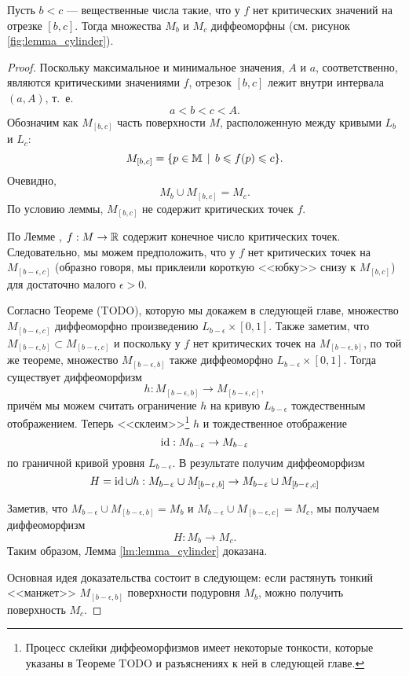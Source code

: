 \documentclass[a4paper,12pt,openany,leqno]{extbook}
\begin{document}
\begin{lemma}
Пусть $b < c$ --- вещественные числа такие, что у $f$ нет критических значений на отрезке $[b, c]$. Тогда множества $M_b$ и $M_c$ диффеоморфны (см. рисунок \ref{fig:lemma_cylinder}).
\label{lm:lemma_cylinder}
\end{lemma}

\begin{proof}
Поскольку максимальное и минимальное значения, $A$ и $a$, соответственно, являются критическими значениями $f$, отрезок $[b, c]$ лежит внутри интервала $(a, A)$, т.~е.
\[
a < b < c < A.
\]
Обозначим как $M_{[b, c]}$ часть поверхности $M$, расположенную между кривыми $L_b$ и $L_c$:
\begin{equation}
M_{[b, c]} = \{p \in \mathbb{M}\,\mid\, b \leqslant f(p) \leqslant c\}.
\end{equation}
Очевидно,
\begin{equation}
M_b \cup M_{[b, c]} = M_c.
\end{equation}
По условию леммы, $M_{[b, c]}$ не содержит критических точек $f$.

По Лемме \label{lm:finite_crit_pts_2d}, $f: M \to \mathbb{R}$ содержит конечное число критических точек. Следовательно, мы можем предположить, что у $f$ нет критических точек на $M_{[b - \epsilon, c]}$ (образно говоря, мы приклеили короткую <<юбку>> снизу к $M_{[b, c]}$) для достаточно малого $\epsilon > 0$.

Согласно Теореме (TODO), которую мы докажем в следующей главе, множество $M_{[b - \epsilon, c]}$ диффеоморфно произведению $L_{b - \epsilon} \times [0, 1]$. Также заметим, что $M_{[b - \epsilon, b]} \subset M_{[b - \epsilon, c]}$ и поскольку у $f$ нет критических точек на $M_{[b - \epsilon, b]}$, по той же теореме, множество $M_{[b - \epsilon, b]}$ также диффеоморфно $L_{b - \epsilon} \times [0, 1]$. Тогда существует диффеоморфизм
\[
h: M_{[b - \epsilon, b]} \to M_{[b - \epsilon, c]},
\]
причём мы можем считать ограничение $h$ на кривую $L_{b - \epsilon}$ тождественным отображением. Теперь <<склеим>>\footnote{Процесс склейки диффеоморфизмов имеет некоторые тонкости, которые указаны в Теореме TODO и разъяснениях к ней в следующей главе.} $h$ и тождественное отображение
\[
\operatorname{id} : M_{b - \upvarepsilon} \to M_{b - \upvarepsilon}
\]
по граничной кривой уровня $L_{b - \epsilon}$. В результате получим диффеоморфизм
\begin{equation}
H = \operatorname{id} \cup h : M_{b - \upvarepsilon} \cup M_{[b - \upvarepsilon, b]} \to M_{b - \upvarepsilon} \cup M_{[b - \upvarepsilon, c]}
\end{equation}

Заметив, что $M_{b - \epsilon} \cup M_{[b - \epsilon, b]} = M_b$ и $M_{b - \epsilon} \cup M_{[b - \epsilon, c]} = M_c$, мы получаем диффеоморфизм
\[
H: M_b \to M_c.
\]
Таким образом, Лемма \ref{lm:lemma_cylinder} доказана.

Основная идея доказательства состоит в следующем: если растянуть тонкий <<манжет>> $M_{[b - \epsilon, b]}$ поверхности подуровня $M_b$, можно получить поверхность $M_c$.
\end{proof}
\end{document}
